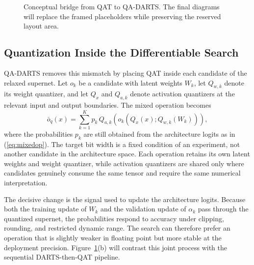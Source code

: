 \documentclass[lettersize,journal]{IEEEtran}
\begin{document}
\begin{figure}[!t]
\centering
\hfill
{}
\caption{Conceptual bridge from QAT to QA-DARTS. The final diagrams will replace the framed placeholders while preserving the reserved layout area.}
\label{fig:conceptualbridge}
\end{figure}

\subsection{Quantization Inside the Differentiable Search}
QA-DARTS removes this mismatch by placing QAT inside each candidate of the relaxed supernet. Let $o_k$ be a candidate with latent weights $W_k$, let $Q_{w,k}$ denote its weight quantizer, and let $Q_x$ and $Q_{a,k}$ denote activation quantizers at the relevant input and output boundaries. The mixed operation becomes
\begin{equation}
\bar{o}_{q}(x)=\sum_{k=1}^{K}p_k\,
Q_{a,k}\!\left(o_k\!\left(Q_x(x);Q_{w,k}(W_k)\right)\right),
\label{eq:quantmixed}
\end{equation}
where the probabilities $p_k$ are still obtained from the architecture logits as in (\ref{eq:mixedop}). The target bit width is a fixed condition of an experiment, not another candidate in the architecture space. Each operation retains its own latent weights and weight quantizer, while activation quantizers are shared only where candidates genuinely consume the same tensor and require the same numerical interpretation.

The decisive change is the signal used to update the architecture logits. Because both the training update of $W_k$ and the validation update of $\alpha_k$ pass through the quantized supernet, the probabilities respond to accuracy under clipping, rounding, and restricted dynamic range. The search can therefore prefer an operation that is slightly weaker in floating point but more stable at the deployment precision. Figure~\ref{fig:conceptualbridge}(b) will contrast this joint process with the sequential DARTS-then-QAT pipeline.
\end{document}
